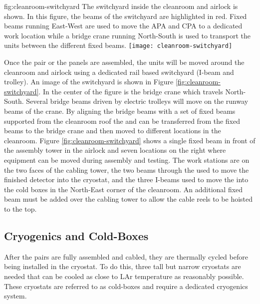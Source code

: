 \begin{dunefigure}{fig:cleanroom-switchyard}
  {The switchyard inside the cleanroom and airlock is shown. In this figure, the beams of the switchyard are highlighted in red. Fixed beams running East-West are used to move the APA and CPA to a dedicated work location while a bridge crane running North-South is used to transport the units between the different fixed beams. }
\texttt{[image: cleanroom-switchyard]}
\end{dunefigure}

Once the  pair or the  panels are assembled, the units will be moved around the cleanroom and airlock using a dedicated rail based switchyard (I-beam and trolley). An image of the switchyard is shown in Figure \ref{fig:cleanroom-switchyard}. In the center of the figure is the bridge crane which travels North-South. Several bridge beams driven by electric trolleys will move on the runway beams of the crane.  By aligning the bridge beams with a set of fixed beams supported from the cleanroom roof the  and  can be transferred from the fixed beams to the bridge crane and then moved to different locations in the cleanroom. Figure \ref{fig:cleanroom-switchyard} shows a single fixed beam in front of the  assembly tower in the airlock and seven locations on the right where equipment can be moved during assembly and testing. The work stations are on the two faces of the  cabling tower, the two beams through the  used to move the finished detector into the cryostat, and the three I-beams used to move the  into the cold boxes in the North-East corner of the cleanroom. An additional fixed beam must be added over the cabling tower to allow the cable reels to be hoisted to the top. 

\subsection{Cryogenics and Cold-Boxes}
\label{sec:fdsp-tc-infr-cryo}
After the  pairs are fully assembled and cabled, they are thermally cycled before being installed in the cryostat. To do this, three tall but narrow cryostats are needed that can be cooled as close to LAr temperature as reasonably possible. These cryostats are referred to as cold-boxes and require a dedicated cryogenics system. 



